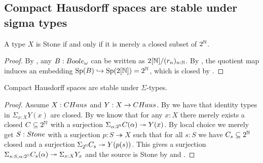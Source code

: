 \subsection{Compact Hausdorff spaces are stable under sigma types}

\begin{lemma}\label{StoneAsClosedSubsetOfCantor}
A type $X$ is Stone if and only if it is merely a closed subset of $2^{\mathbb{N}}$.
\end{lemma}
\begin{proof}
  By , any $B:\Boole$ can be written as $2[\mathbb{N}]/(r_n)_{n:\mathbb{N}}$. %
  By , the quotient map induces an embedding $\operatorname{Sp}(B)\hookrightarrow \operatorname{Sp}(2[\mathbb{N}])= 2^{\mathbb{N}}$, 
  which is closed by .
\end{proof}


\begin{lemma}\label{SigmaCompactHausdorff}
Compact Hausdorff spaces are stable under $\Sigma$-types.
\end{lemma}

\begin{proof}
Assume $X:\CHaus$ and $Y:X\to \CHaus$. By  we have that identity types in $\Sigma_{x:X}Y(x)$ are closed. By  we know that for any $x:X$ there merely exists a closed $C\subseteq 2^{\mathbb{N}}$ with a surjection $\Sigma_{\alpha:2^{\mathbb{N}}}C(\alpha) \twoheadrightarrow Y(x)$. By local choice we merely get $S:\Stone$ with a surjection $p:S\twoheadrightarrow  X$ such that for all $s:S$ we have $C_s\subseteq 2^{\mathbb{N}}$ closed and a surjection $\Sigma_{2^{\mathbb{N}}}C_s\twoheadrightarrow Y(p(s))$. This gives a surjection $\Sigma_{s:S,\alpha:2^{\mathbb{N}}}C_s(\alpha)\twoheadrightarrow\Sigma_{x:X}Y_x$ and the source is Stone by  and .
\end{proof}
